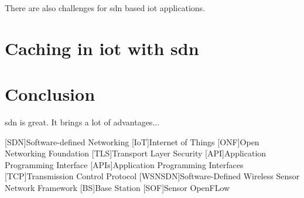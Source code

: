 \documentclass[conference]{IEEEtran}
\begin{document}
	There are also challenges for \ac{sdn} based \ac{iot} applications.

	\cite{8777339} \cite{10.1145/3102304.3102319}

	\section{Caching in \ac{iot} with \ac{sdn}}
	\label{section:caching}

	\cite{Katta2016-tr} \cite{Jazaeri2023-bu} \cite{10.1007/s10586-023-04023-9} \cite{Ruggeri2021-qs}

	\section{Conclusion}
	\label{section:conclusion}

	\ac{sdn} is great. It brings a lot of advantages...

	\printbibliography
	\begin{acronym}
		[SDN]{Software-defined Networking}
		[IoT]{Internet of Things}
		[ONF]{Open Networking Foundation}
		[TLS]{Transport Layer Security}
		[API]{Application Programming Interface}
		{Application Programming Interfaces}
		[TCP]{Transmission Control Protocol}
		[WSNSDN]{Software-Defined Wireless Sensor Network Framework }
		[BS]{Base Station}
		[SOF]{Sensor OpenFLow}
	\end{acronym}

\end{document}
